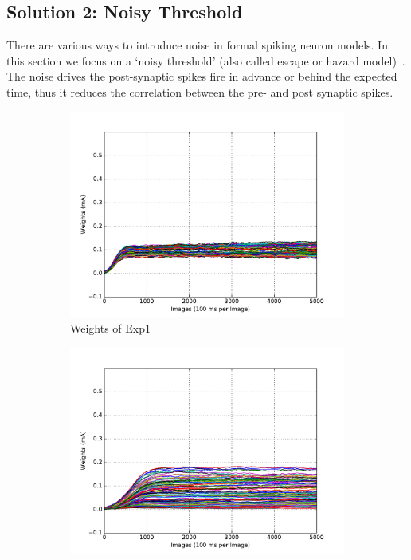 \subsection{Solution 2: Noisy Threshold}
There are various ways to introduce noise in formal spiking neuron models. In this section we focus on a `noisy threshold' (also called escape or hazard model)~\cite{gerstner2002spiking}.
The noise drives the post-synaptic spikes fire in advance or behind the expected time, thus it reduces the correlation between the pre- and post synaptic spikes.

\begin{figure}
	\centering
	\begin{subfigure}[t]{0.4\textwidth}
		\includegraphics[width=\textwidth]{pics_sdlm/03_exp_SAE_noise_long/exp1_weights_s.pdf}
		\caption{Weights of Exp1}
	\end{subfigure}
	\begin{subfigure}[t]{0.4\textwidth}
		\includegraphics[width=\textwidth]{pics_sdlm/03_exp_SAE_noise_long/exp2_weights_s.pdf}

\end{subfigure}
\end{figure}

